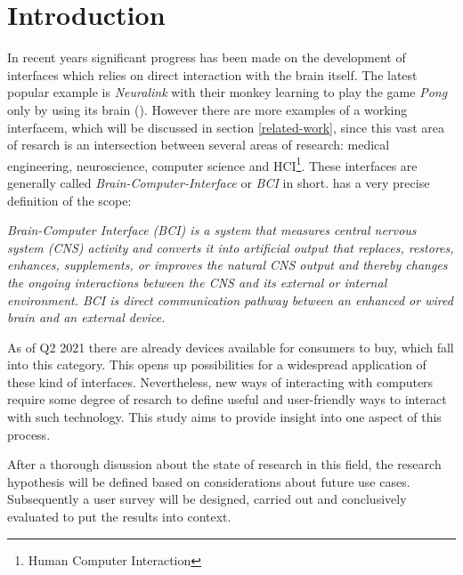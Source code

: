 
    \chapter{Introduction}\label{introduction}



        In recent years significant progress has been made on the development of interfaces which relies on direct interaction with the brain itself. The latest popular example is \textit{Neuralink} with their monkey learning to play the game \textit{Pong} only by using its brain (\cite{Neuralink.2021}). However there are more examples of a working interfacem, which will be discussed in section \ref*{related-work}, since this vast area of resarch is an intersection between several areas of research: medical engineering, neuroscience, computer science and HCI\footnote{Human Computer Interaction}.
        These interfaces are generally called \textit{Brain-Computer-Interface} or \textit{BCI} in short. \cite{MicrosoftResearch.23102020} has a very precise definition of the scope:

        \medskip
            \emph{Brain-Computer Interface (BCI) is a system that measures central nervous system (CNS) activity and converts it into artificial output that replaces, restores, enhances, supplements, or improves the natural CNS output and thereby changes the ongoing interactions between the CNS and its external or internal environment. BCI is direct communication pathway between an enhanced or wired brain and an external device.}
        \medskip

        As of Q2 2021 there are already devices available for consumers to buy, which fall into this category. This opens up possibilities for a widespread application of these kind of interfaces. Nevertheless, new ways of interacting with computers require some degree of resarch to define useful and user-friendly ways to interact with such technology. This study aims to provide insight into one aspect of this process.

        After a thorough disussion about the state of research in this field, the research hypothesis will be defined based on considerations about future use cases. Subsequently a user survey will be designed, carried out and conclusively evaluated to put the results into context.

        \clearpage\thispagestyle{empty}
        
